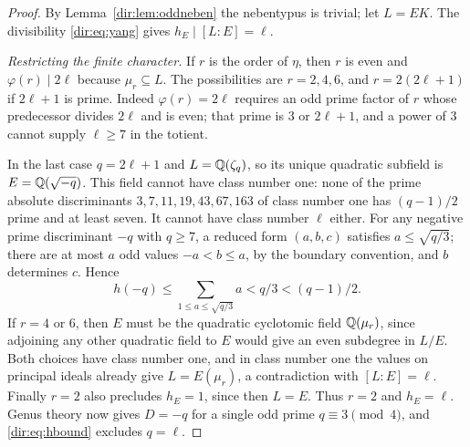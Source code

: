 \begin{proof}
By Lemma~\ref{dir:lem:oddneben} the nebentypus is trivial; let $L=EK$. The divisibility
\eqref{dir:eq:yang} gives $h_E\mid[L:E]=\ell$.

\emph{Restricting the finite character.} If $r$ is the order of $\eta$, then $r$ is
even and $\varphi(r)\mid2\ell$ because $\mu_r\subseteq L$. The possibilities are
$r=2,4,6$, and $r=2(2\ell+1)$ if $2\ell+1$ is prime. Indeed $\varphi(r)=2\ell$ requires
an odd prime factor of $r$ whose predecessor divides $2\ell$ and is even; that prime is
$3$ or $2\ell+1$, and a power of $3$ cannot supply $\ell\ge7$ in the totient.

In the last case $q=2\ell+1$ and $L=\mathbb{Q}(\zeta_q)$, so its unique quadratic subfield is
$E=\mathbb{Q}(\sqrt{-q})$. This field cannot have class number one: none of the prime absolute
discriminants $3,7,11,19,43,67,163$ of class number one has $(q-1)/2$ prime and at
least seven. It cannot have class number $\ell$ either. For any negative prime
discriminant $-q$ with $q\ge7$, a reduced form $(a,b,c)$ satisfies $a\le\sqrt{q/3}$;
there are at most $a$ odd values $-a<b\le a$, by the boundary convention, and $b$
determines $c$. Hence
\begin{equation}\label{dir:eq:hbound}
 h(-q)\le\sum_{1\le a\le\sqrt{q/3}}a<q/3<(q-1)/2 .
\end{equation}
If $r=4$ or $6$, then $E$ must be the quadratic cyclotomic field $\mathbb{Q}(\mu_r)$, since
adjoining any other quadratic field to $E$ would give an even subdegree in $L/E$. Both
choices have class number one, and in class number one the values on principal ideals
already give $L=E(\mu_r)$, a contradiction with $[L:E]=\ell$. Finally $r=2$ also
precludes $h_E=1$, since then $L=E$. Thus $r=2$ and $h_E=\ell$. Genus theory now gives
$D=-q$ for a single odd prime $q\equiv3\pmod4$, and \eqref{dir:eq:hbound} excludes
$q=\ell$.


\end{proof}
